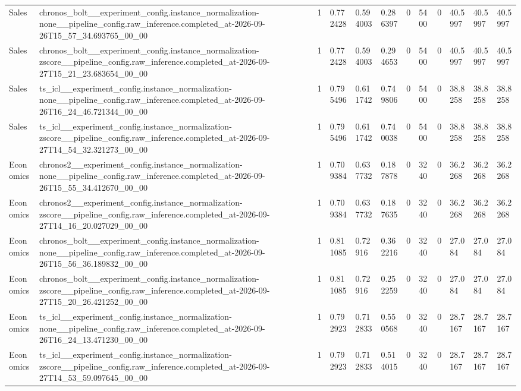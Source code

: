 \begin{tabular}{llllllllllll}
Sales & chronos\_bolt\_\_experiment\_config.instance\_normalization-none\_\_pipeline\_config.raw\_inference.completed\_at-2026-09-26T15\_57\_34.693765\_00\_00 & 1 & 0.772428 & 0.594003 & 0.286397 & 0 & 5400 & 0 & 40.5997 & 40.5997 & 40.5997 \\
Sales & chronos\_bolt\_\_experiment\_config.instance\_normalization-zscore\_\_pipeline\_config.raw\_inference.completed\_at-2026-09-27T15\_21\_23.683654\_00\_00 & 1 & 0.772428 & 0.594003 & 0.294653 & 0 & 5400 & 0 & 40.5997 & 40.5997 & 40.5997 \\
Sales & ts\_icl\_\_experiment\_config.instance\_normalization-none\_\_pipeline\_config.raw\_inference.completed\_at-2026-09-26T16\_24\_46.721344\_00\_00 & 1 & 0.795496 & 0.611742 & 0.749806 & 0 & 5400 & 0 & 38.8258 & 38.8258 & 38.8258 \\
Sales & ts\_icl\_\_experiment\_config.instance\_normalization-zscore\_\_pipeline\_config.raw\_inference.completed\_at-2026-09-27T14\_54\_32.321273\_00\_00 & 1 & 0.795496 & 0.611742 & 0.740038 & 0 & 5400 & 0 & 38.8258 & 38.8258 & 38.8258 \\
Economics & chronos2\_\_experiment\_config.instance\_normalization-none\_\_pipeline\_config.raw\_inference.completed\_at-2026-09-26T15\_55\_34.412670\_00\_00 & 1 & 0.709384 & 0.637732 & 0.187878 & 0 & 3240 & 0 & 36.2268 & 36.2268 & 36.2268 \\
Economics & chronos2\_\_experiment\_config.instance\_normalization-zscore\_\_pipeline\_config.raw\_inference.completed\_at-2026-09-27T14\_16\_20.027029\_00\_00 & 1 & 0.709384 & 0.637732 & 0.187635 & 0 & 3240 & 0 & 36.2268 & 36.2268 & 36.2268 \\
Economics & chronos\_bolt\_\_experiment\_config.instance\_normalization-none\_\_pipeline\_config.raw\_inference.completed\_at-2026-09-26T15\_56\_36.189832\_00\_00 & 1 & 0.811085 & 0.72916 & 0.362216 & 0 & 3240 & 0 & 27.084 & 27.084 & 27.084 \\
Economics & chronos\_bolt\_\_experiment\_config.instance\_normalization-zscore\_\_pipeline\_config.raw\_inference.completed\_at-2026-09-27T15\_20\_26.421252\_00\_00 & 1 & 0.811085 & 0.72916 & 0.252259 & 0 & 3240 & 0 & 27.084 & 27.084 & 27.084 \\
Economics & ts\_icl\_\_experiment\_config.instance\_normalization-none\_\_pipeline\_config.raw\_inference.completed\_at-2026-09-26T16\_24\_13.471230\_00\_00 & 1 & 0.792923 & 0.712833 & 0.550568 & 0 & 3240 & 0 & 28.7167 & 28.7167 & 28.7167 \\
Economics & ts\_icl\_\_experiment\_config.instance\_normalization-zscore\_\_pipeline\_config.raw\_inference.completed\_at-2026-09-27T14\_53\_59.097645\_00\_00 & 1 & 0.792923 & 0.712833 & 0.514015 & 0 & 3240 & 0 & 28.7167 & 28.7167 & 28.7167 \\

\end{tabular}
